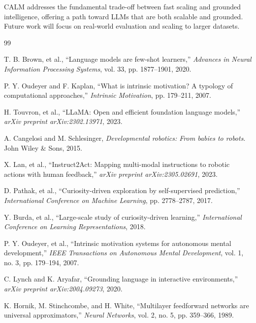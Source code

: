 \documentclass{IEEEtran}
\begin{document}
CALM addresses the fundamental trade-off between fast scaling and grounded intelligence, offering a path toward LLMs that are both scalable and grounded. Future work will focus on real-world evaluation and scaling to larger datasets.

\begin{thebibliography}{99}

T. B. Brown, et al., ``Language models are few-shot learners,'' \textit{Advances in Neural Information Processing Systems}, vol. 33, pp. 1877--1901, 2020.

P. Y. Oudeyer and F. Kaplan, ``What is intrinsic motivation? A typology of computational approaches,'' \textit{Intrinsic Motivation}, pp. 179--211, 2007.

H. Touvron, et al., ``LLaMA: Open and efficient foundation language models,'' \textit{arXiv preprint arXiv:2302.13971}, 2023.

A. Cangelosi and M. Schlesinger, \textit{Developmental robotics: From babies to robots}. John Wiley \& Sons, 2015.

X. Lan, et al., ``Instruct2Act: Mapping multi-modal instructions to robotic actions with human feedback,'' \textit{arXiv preprint arXiv:2305.02691}, 2023.

D. Pathak, et al., ``Curiosity-driven exploration by self-supervised prediction,'' \textit{International Conference on Machine Learning}, pp. 2778--2787, 2017.

Y. Burda, et al., ``Large-scale study of curiosity-driven learning,'' \textit{International Conference on Learning Representations}, 2018.

P. Y. Oudeyer, et al., ``Intrinsic motivation systems for autonomous mental development,'' \textit{IEEE Transactions on Autonomous Mental Development}, vol. 1, no. 3, pp. 179--194, 2007.

C. Lynch and K. Aryafar, ``Grounding language in interactive environments,'' \textit{arXiv preprint arXiv:2004.09273}, 2020.

K. Hornik, M. Stinchcombe, and H. White, ``Multilayer feedforward networks are universal approximators,'' \textit{Neural Networks}, vol. 2, no. 5, pp. 359--366, 1989.

\end{thebibliography}
\end{document}
